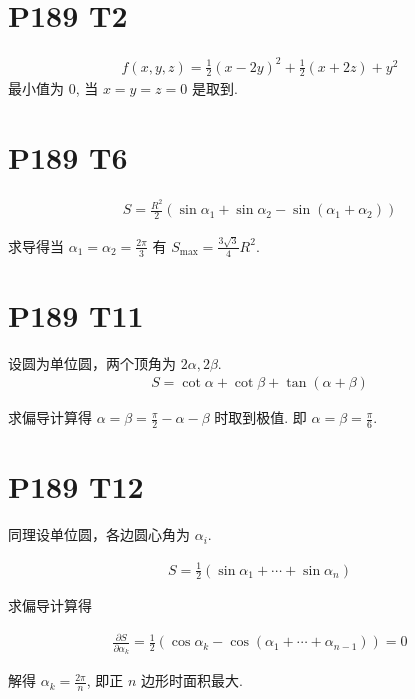 \documentclass{article}
\begin{document}
\section*{P189 T2}

\begin{align*}
    f(x, y, z) = \frac{1}{2}(x - 2y)^2 + \frac{1}{2}(x + 2z) + y^2
\end{align*}
最小值为 0, 当 $x = y = z = 0$ 是取到.

\section*{P189 T6}

\begin{align*}
    S = \frac{R^2}{2}(\sin \alpha_1 + \sin \alpha_2 - \sin (\alpha_1 + \alpha_2))
\end{align*}

求导得当 $\alpha_1 = \alpha_2 = \frac{2\pi}{3}$ 有 $S_{\text{max}} = \frac{3\sqrt{3}}{4}R^2$.

\section*{P189 T11}

设圆为单位圆，两个顶角为 $2\alpha, 2\beta$.
\begin{align*}
    S = \cot \alpha + \cot \beta + \tan (\alpha + \beta) 
\end{align*}

求偏导计算得 $\alpha = \beta = \frac{\pi}{2} - \alpha - \beta$ 时取到极值. 即 $\alpha = \beta = \frac{\pi}{6}$.

\section*{P189 T12}

同理设单位圆，各边圆心角为 $\alpha_i$.

\begin{align*}
    S = \frac{1}{2}(\sin \alpha_1 + \cdots + \sin \alpha_n)
\end{align*}

求偏导计算得

\begin{align*}
    \frac{\partial S}{\partial \alpha_k} = \frac{1}{2}(\cos \alpha_k - \cos (\alpha_1 + \cdots + \alpha_{n - 1})) = 0
\end{align*}

解得 $\alpha_k = \frac{2\pi}{n}$, 即正 $n$ 边形时面积最大.
\end{document}
